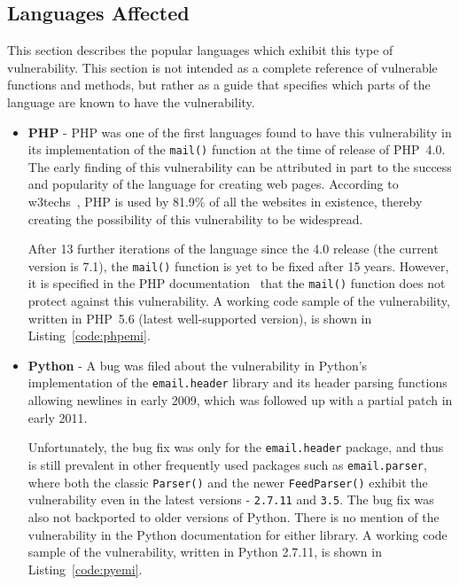 \subsection{Languages Affected}
\label{languages}
This section describes the popular languages which exhibit this type of vulnerability. This section is not intended as a complete reference of vulnerable functions and methods, but rather as a guide that specifies which parts of the language are known to have the vulnerability.

\begin{itemize}
\item{\textbf{PHP}} - PHP was one of the first languages found to have this vulnerability in its implementation of the \texttt{mail()} function at the time of release of PHP~4.0. The early finding of this vulnerability can be attributed in part to the success and popularity of the language for creating web pages. According to w3techs~\cite{W3techs}, PHP is used by 81.9\% of all the websites in existence, thereby creating the possibility of this vulnerability to be widespread.

After 13 further iterations of the language since the 4.0 release (the current version is 7.1), the \texttt{mail()} function is yet to be fixed after 15 years. However, it is specified in the PHP documentation~\cite{PHPDocs} that the \texttt{mail()} function does not protect against this vulnerability.
A working code sample of the vulnerability, written in PHP~5.6 (latest well-supported version), is shown in  Listing~\ref{code:phpemi}.

\item{\textbf{Python}} -
A bug was filed about the vulnerability in Python's implementation of the \texttt{email.header} library and its header parsing functions allowing newlines in early 2009, which was followed up with a partial patch in early 2011.

Unfortunately, the bug fix was only for the \texttt{email.header} package, and thus is still prevalent in other frequently used packages such as \texttt{email.parser}, where both the classic \texttt{Parser()} and the newer \texttt{FeedParser()} exhibit the vulnerability even in the latest versions - \texttt{2.7.11} and \texttt{3.5}. The bug fix was also not backported to older versions of Python.
There is no mention of the vulnerability in the Python documentation for either library.
A working code sample of the vulnerability, written in Python 2.7.11, is shown in Listing~\ref{code:pyemi}.



\end{itemize}
